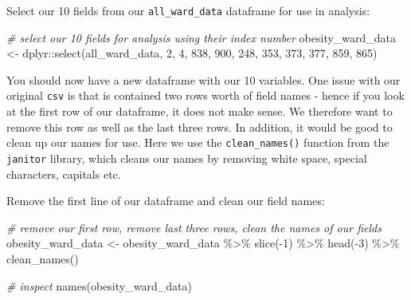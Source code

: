 \documentclass[
]{book}
\newenvironment{Shaded}{\begin{snugshade}}{\end{snugshade}}
\newcommand{\CommentTok}[1]{\textcolor[rgb]{0.56,0.35,0.01}{\textit{#1}}}
\newcommand{\DecValTok}[1]{\textcolor[rgb]{0.00,0.00,0.81}{#1}}
\newcommand{\FunctionTok}[1]{\textcolor[rgb]{0.00,0.00,0.00}{#1}}
\newcommand{\NormalTok}[1]{#1}
\newcommand{\OtherTok}[1]{\textcolor[rgb]{0.56,0.35,0.01}{#1}}
\newcommand{\SpecialCharTok}[1]{\textcolor[rgb]{0.00,0.00,0.00}{#1}}
\begin{document}
Select our 10 fields from our \texttt{all\_ward\_data} dataframe for use in analysis:

\begin{Shaded}
\begin{Highlighting}[]
\CommentTok{\# select our 10 fields for analysis using their index number}
\NormalTok{obesity\_ward\_data }\OtherTok{\textless{}{-}}\NormalTok{ dplyr}\SpecialCharTok{::}\FunctionTok{select}\NormalTok{(all\_ward\_data, }\DecValTok{2}\NormalTok{, }\DecValTok{4}\NormalTok{, }\DecValTok{838}\NormalTok{, }\DecValTok{900}\NormalTok{, }\DecValTok{248}\NormalTok{, }\DecValTok{353}\NormalTok{, }\DecValTok{373}\NormalTok{,}
    \DecValTok{377}\NormalTok{, }\DecValTok{859}\NormalTok{, }\DecValTok{865}\NormalTok{)}
\end{Highlighting}
\end{Shaded}

You should now have a new dataframe with our 10 variables. One issue with our original \texttt{csv} is that is contained two rows worth of field names - hence if you look at the first row of our dataframe, it does not make sense. We therefore want to remove this row as well as the last three rows. In addition, it would be good to clean up our names for use. Here we use the \texttt{clean\_names()} function from the \texttt{janitor} library, which cleans our names by removing white space, special characters, capitals etc.

Remove the first line of our dataframe and clean our field names:

\begin{Shaded}
\begin{Highlighting}[]
\CommentTok{\# remove our first row, remove last three rows, clean the names of our fields}
\NormalTok{obesity\_ward\_data }\OtherTok{\textless{}{-}}\NormalTok{ obesity\_ward\_data }\SpecialCharTok{\%\textgreater{}\%}
  \FunctionTok{slice}\NormalTok{(}\SpecialCharTok{{-}}\DecValTok{1}\NormalTok{) }\SpecialCharTok{\%\textgreater{}\%}
  \FunctionTok{head}\NormalTok{(}\SpecialCharTok{{-}}\DecValTok{3}\NormalTok{) }\SpecialCharTok{\%\textgreater{}\%}
  \FunctionTok{clean\_names}\NormalTok{()}

\CommentTok{\# inspect}
\FunctionTok{names}\NormalTok{(obesity\_ward\_data)}
\end{Highlighting}
\end{Shaded}
\end{document}
